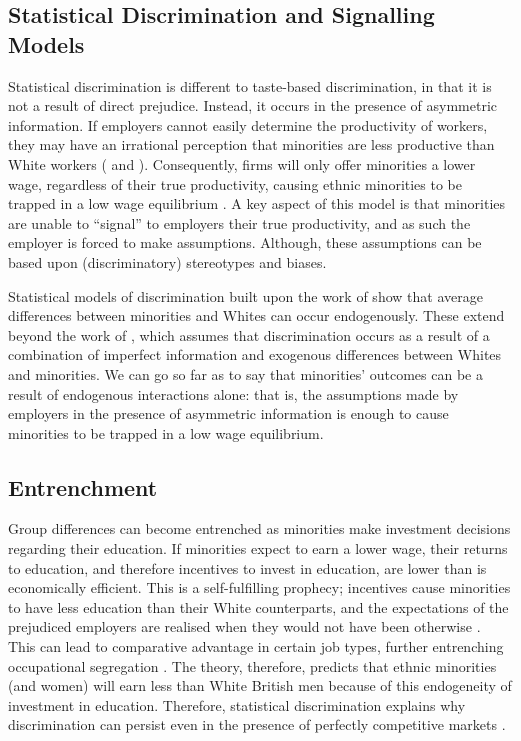 \documentclass[class=article, crop=false]{standalone}
\begin{document}
\subsection{Statistical Discrimination and Signalling Models}
\label{sec:Stat_discrim and signalling}
Statistical discrimination is different to taste-based discrimination, in that it is not a result of direct prejudice. Instead, it occurs in the presence of asymmetric information. If employers cannot easily determine the productivity of workers, they may have an irrational perception that minorities are less productive than White workers (\citet{Phelps} and \citet{LundbergB}). Consequently, firms will only offer minorities a lower wage, regardless of their true productivity, causing ethnic minorities to be trapped in a low wage equilibrium \citet{Barr}. A key aspect of this model is that minorities are unable to \enquote{signal} to employers their true productivity, and as such the employer is forced to make assumptions. Although, these assumptions can be based upon (discriminatory) stereotypes and biases.

Statistical models of discrimination built upon the work of \citep{Arrow} show that average differences between minorities and Whites can occur endogenously. These extend beyond the work of \citet{Phelps}, which assumes that discrimination occurs as a result of a combination of imperfect information and exogenous differences between Whites and minorities. We can go so far as to say that minorities' outcomes can be a result of endogenous interactions alone: that is, the assumptions made by employers in the presence of asymmetric information is enough to cause minorities to be trapped in a low wage equilibrium. 

\subsection{Entrenchment}
Group differences can become entrenched as minorities make investment decisions regarding their education. If minorities expect to earn a lower wage, their returns to education, and therefore incentives to invest in education, are lower than is economically efficient. This is a self-fulfilling prophecy; incentives cause minorities to have less education than their White counterparts, and the expectations of the prejudiced employers are realised when they would not have been otherwise \citep{Hanming}. This can lead to comparative advantage in certain job types, further entrenching occupational segregation \citep{Altonji}. The theory, therefore, predicts that ethnic minorities (and women) will earn less than White British men because of this endogeneity of investment in education. Therefore, statistical discrimination explains why discrimination can persist even in the presence of perfectly competitive markets \citep{LundbergB}.
\end{document}
